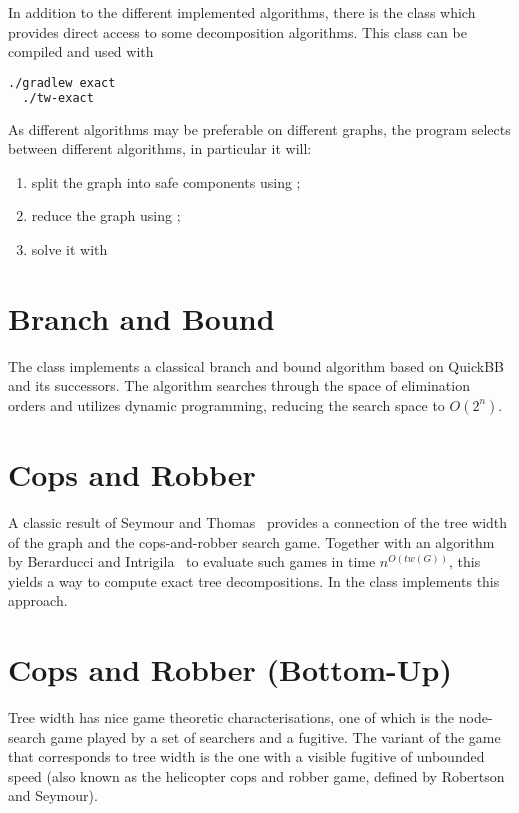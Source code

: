 \documentclass[a4paper, ukenglish, twoside, openright]{jdrasilmanual}
\begin{document}
In addition to the different implemented algorithms, there is the
class  which provides direct access to some
decomposition algorithms. This class can be compiled and used with
\begin{lstlisting}[language=bash]
  ./gradlew exact
  ./tw-exact
\end{lstlisting}
As different algorithms may be preferable on different graphs, the
program selects between different algorithms, in particular it will:
\begin{enumerate}
  \item split the graph into safe components using ;
  \item reduce the graph using ;
  \item solve it with 
\end{enumerate}

\section{Branch and Bound}
The class  implements a classical branch and bound algorithm based on QuickBB~\cite{GogateD2004} and its successors.
The algorithm searches through the space of elimination orders and utilizes dynamic programming,
reducing the search space to $O(2^n)$.

\section{Cops and Robber}
A classic result of Seymour and Thomas~\cite{SeymourT1993}
provides a connection of the tree width of the graph and the
cops-and-robber search game. Together with an algorithm by Berarducci
and Intrigila~\cite{BerarducciI1993} to evaluate such games in time
$n^{O(tw(G))}$, this yields a way to compute exact tree decompositions. In
\Jdrasil{} the class  implements this approach.

\section{Cops and Robber (Bottom-Up)}
Tree width has nice game theoretic characterisations, one of which is
the node-search game played by a set of searchers and a fugitive. The
variant of the game that corresponds to tree width is the one with a
visible fugitive of unbounded speed (also known as the helicopter cops
and robber game, defined by Robertson and Seymour).
 
\end{document}
